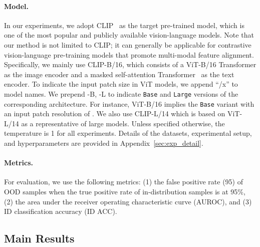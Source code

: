 \documentclass{article}
\begin{document}
\paragraph{Model.} In our experiments, we adopt CLIP~\cite{radford2021learning} as the target pre-trained model, which is one of the most popular and publicly available vision-language models. Note that our method is not limited to CLIP; it can generally be applicable for contrastive vision-language pre-training models that promote multi-modal feature alignment.
Specifically,
we mainly use CLIP-B/16, which consists of a ViT-B/16 Transformer as the image encoder and  a masked self-attention Transformer~\cite{vaswani2017attention} as the text encoder. To indicate the input patch size in ViT models, we append ``/x'' to model names. We prepend -B, -L to indicate \texttt{Base} and \texttt{Large} versions of the corresponding architecture. For instance, ViT-B/16 implies the \texttt{Base} variant with an input patch resolution of . We also use CLIP-L/14 which is based on ViT-L/14 as a representative of large models. Unless specified otherwise, the temperature  is 1 for all experiments. Details of the datasets, experimental setup, and hyperparameters are provided in Appendix~\ref{sec:exp_detail}.

\paragraph{Metrics.} For evaluation,
we use the following metrics: (1) the false positive rate (95) of OOD samples when the true positive rate of in-distribution samples is at 95\%, (2) the area under the receiver operating characteristic curve (AUROC), and (3) ID classification accuracy (ID ACC). 

\subsection{Main Results}
\end{document}
